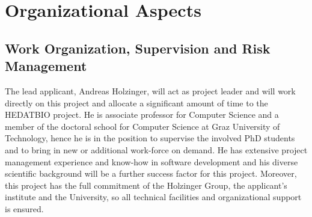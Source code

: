 \documentclass[a4paper,11pt]{article}
\begin{document}

\newpage

\section{Organizational Aspects}

\subsection{Work Organization, Supervision and Risk Management}

The lead applicant, Andreas Holzinger, will act as project leader and will work directly on this project and allocate a significant amount of time to the HEDATBIO project. He is associate professor for Computer Science and a member of the doctoral school for Computer Science at Graz University of Technology, hence he is in the position to supervise the involved PhD students and to bring in new or additional work-force on demand.
He has extensive project management experience and know-how in software development and his diverse scientific background will be a further success factor for this project. Moreover, this project has the full commitment of the Holzinger Group, the applicant's institute and the University, so all technical facilities and organizational support is ensured.
\\[0,2cm]
\end{document}
